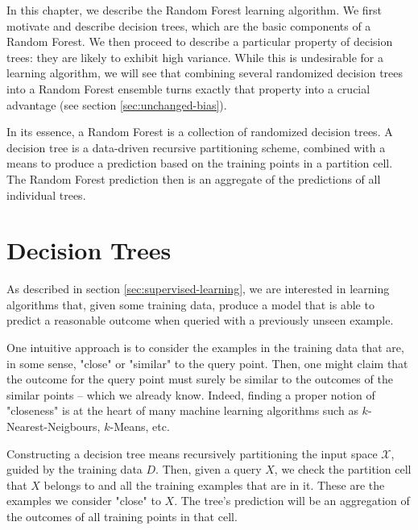 \documentclass[../main.tex]{subfiles}
\begin{document}
In this chapter, we describe the Random Forest learning algorithm. We first motivate and describe decision trees, which are the basic components of a Random Forest. We then proceed to describe a particular property of decision trees: they are likely to exhibit high variance. While this is undesirable for a learning algorithm, we will see that combining several randomized decision trees into a Random Forest ensemble turns exactly that property into a crucial advantage (see section \ref{sec:unchanged-bias}).

In its essence, a Random Forest is a collection of randomized decision trees. A decision tree is a data-driven recursive partitioning scheme, combined with a means to produce a prediction based on the training points in a partition cell. The Random Forest prediction then is an aggregate of the predictions of all individual trees.

\section{Decision Trees}
\label{sec:decision-trees}

As described in section \ref{sec:supervised-learning}, we are interested in learning algorithms that, given some training data, produce a model that is able to predict a reasonable outcome when queried with a previously unseen example. 


One intuitive approach is to consider the examples in the training data that are, in some sense, "close" or "similar" to the query point. Then, one might claim that the outcome for the query point must surely be similar to the outcomes of the similar points -- which we already know. Indeed, finding a proper notion of "closeness" is at the heart of many machine learning algorithms such as $k$-Nearest-Neigbours, $k$-Means, etc.

Constructing a decision tree means recursively partitioning the input space $\mathcal{X}$, guided by the training data $D$. Then, given a query $X$, we check the partition cell that $X$ belongs to and all the training examples that are in it. These are the examples we consider "close" to $X$. The tree's prediction will be an aggregation of the outcomes of all training points in that cell. 
\end{document}
